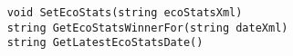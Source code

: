 \begin{verbatim}
    void SetEcoStats(string ecoStatsXml)
    string GetEcoStatsWinnerFor(string dateXml)
    string GetLatestEcoStatsDate()
\end{verbatim}